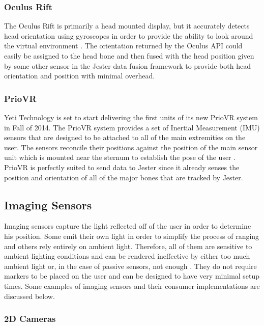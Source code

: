 \subsubsection{Oculus Rift}\label{sec:oculus}

The Oculus Rift is primarily a head mounted display, but it accurately detects head orientation using gyroscopes in order to provide the ability to look around the virtual environment \cite{oculus2012oculus}. The orientation returned by the Oculus API could easily be assigned to the head bone and then fused with the head position given by some other sensor in the Jester data fusion framework to provide both head orientation and position with minimal overhead.

\subsubsection{PrioVR}\label{sec:prio}

Yeti Technology is set to start delivering the first units of its new PrioVR system in Fall of 2014. The PrioVR system provides a set of Inertial Measurement (IMU) sensors that are designed to be attached to all of the main extremities on the user. The sensors reconcile their positions against the position of the main sensor unit which is mounted near the sternum to establish the pose of the user \cite{priovr}. PrioVR is perfectly suited to send data to Jester since it already senses the position and orientation of all of the major bones that are tracked by Jester.

\subsection{Imaging Sensors}

Imaging sensors capture the light reflected off of the user in order to determine his position. Some emit their own light in order to simplify the process of ranging and others rely entirely on ambient light. Therefore, all of them are sensitive to ambient lighting conditions and can be rendered ineffective by either too much ambient light or, in the case of passive sensors, not enough \cite{besl1988active}. They do not require markers to be placed on the user and can be designed to have very minimal setup times. Some examples of imaging sensors and their consumer implementations are discussed below.

\subsubsection{2D Cameras}

